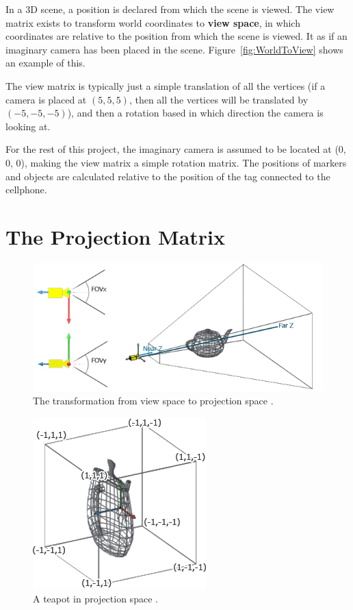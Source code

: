 In a 3D scene, a position is declared from which the scene is viewed. The view matrix exists to transform world coordinates to \textbf{view space}, in which coordinates are relative to the position from which the scene is viewed. It as if an imaginary camera has been placed in the scene. Figure~\ref{fig:WorldToView} shows an example of this.

The view matrix is typically just a simple translation of all the vertices (if a camera is placed at $(5, 5, 5)$, then all the vertices will be translated by $(-5, -5, -5)$), and then a rotation based in which direction the camera is looking at. 

For the rest of this project, the imaginary camera is assumed to be located at (0, 0, 0), making the view matrix a simple rotation matrix. The positions of markers and objects are calculated relative to the position of the tag connected to the cellphone.

\section{The Projection Matrix}

\begin{figure}
	\centering
	\includegraphics[width=\linewidth]{Figures/ProjectionMatrix.png}
	\decoRule
	\caption{The transformation from view space to projection space \cite{CodingLabs}.}
	\label{fig:ProjectionMatrix}
\end{figure}

\begin{figure}
	\centering
	\includegraphics{Figures/ProjectionMatrix2.png}
	\decoRule
	\caption{A teapot in projection space \cite{CodingLabs}.}
	\label{fig:ProjectionMatrix2}
\end{figure}

